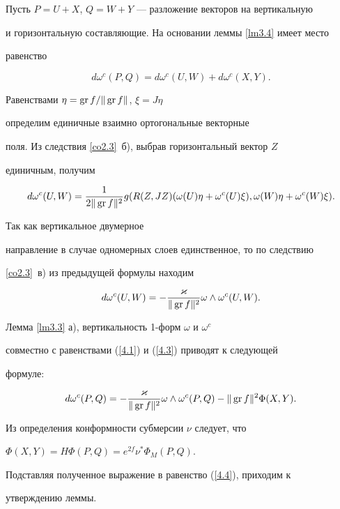 \begin{pf}


Пусть $P=U+X$, $Q=W+Y$ --- разложение векторов на вертикальную


и горизонтальную составляющие. На основании леммы \ref{lm3.4} имеет место


равенство


\begin{equation}


d\omega^c(P,Q)=d\omega^c(U,W)+d\omega^c(X,Y).\label{4.1}


\end{equation}


Равенствами $\eta =\operatorname{gr} f/\Vert \operatorname{gr} f\Vert$, $\xi=J\eta$


определим единичные взаимно ортогональные векторные


поля. Из следствия \ref{co2.3}~б), выбрав горизонтальный вектор $Z$


единичным, получим


$$


d\omega^c(U,W)=\frac1{2\Vert \GR f\Vert^2}g(R(Z,JZ)(\omega (U)\eta +


\omega^c(U)\xi ),\omega (W)\eta +\omega^c(W)\xi ).


$$


Так как вертикальное двумерное


направление в случае одномерных слоев единственное, то по следствию


\ref{co2.3}~в) из предыдущей формулы находим


\begin{equation}


d\omega^c(U,W)=-\frac{\vkap }{\Vert \GR f\Vert^2}\omega \land


\omega^c(U,W).


\label{4.3}


\end{equation}


Лемма \ref{lm3.3} а), вертикальность 1-форм $\omega $ и $\omega^c$


совместно с равенствами (\ref{4.1}) и (\ref{4.3}) приводят к следующей


формуле:


\begin{equation}


d\omega^c(P,Q)=-\frac{\vkap }{\Vert \GR f\Vert^2}\omega\land\omega^c(P,Q)-


\Vert \GR f\Vert^2\Phi (X,Y).


\label{4.4}


\end{equation}


Из определения конформности субмерсии $\nu$ следует, что


$\Phi (X,Y)=H\Phi (P,Q)=e^{2f}\nu^*\Phi_M(P,Q)$.


Подставляя полученное выражение в равенство (\ref{4.4}), приходим к


утверждению леммы.


\end{pf}





